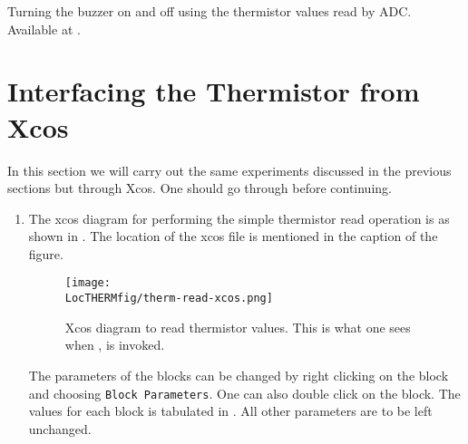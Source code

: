 \begin{scicode}
  {Turning the buzzer on and off using the thermistor values read by
    ADC.  Available at .}
\label{sci:therm-buzzer}

\end{scicode}

\section{Interfacing the Thermistor from Xcos}
In this section we will carry out the same experiments discussed in
the previous sections but through Xcos. One should go through
 before continuing.

\begin{enumerate}
\item The xcos diagram for performing the simple thermistor read
  operation is as shown in . The location of
  the xcos file is mentioned in the caption of the figure.
  \begin{figure}
    \centering
    \texttt{[image: \\LocTHERMfig/therm-read-xcos.png]}
    \caption[Xcos diagram to read thermistor values]{Xcos diagram to
      read thermistor values.  This is what one sees when
      , is invoked.}
    \label{fig:therm-read}
  \end{figure}
  The parameters of the blocks can be changed by right clicking on the
  block and choosing {\tt Block Parameters}. One can also double click
  on the block. The values for each block is tabulated in
  .  All other parameters are to be left
  unchanged.


\end{enumerate}
